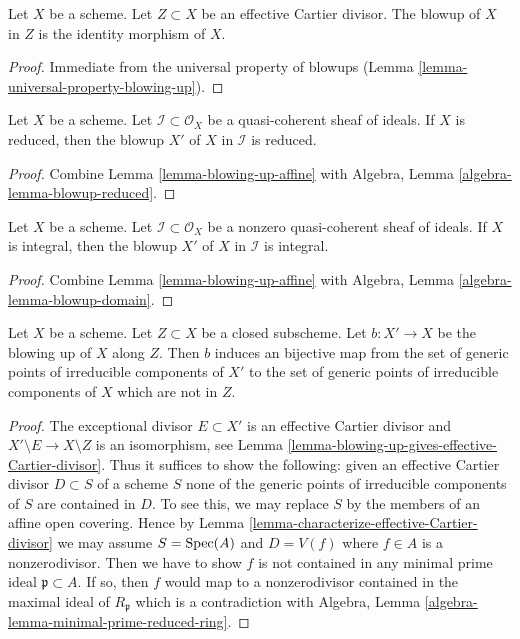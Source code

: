 \begin{lemma}
\label{lemma-blow-up-effective-Cartier-divisor}
Let $X$ be a scheme. Let $Z \subset X$ be an effective Cartier divisor.
The blowup of $X$ in $Z$ is the identity morphism of $X$.
\end{lemma}

\begin{proof}
Immediate from the universal property of blowups
(Lemma \ref{lemma-universal-property-blowing-up}).
\end{proof}

\begin{lemma}
\label{lemma-blow-up-reduced-scheme}
Let $X$ be a scheme. Let $\mathcal{I} \subset \mathcal{O}_X$ be a
quasi-coherent sheaf of ideals. If $X$ is reduced, then the
blowup $X'$ of $X$ in $\mathcal{I}$ is reduced.
\end{lemma}

\begin{proof}
Combine Lemma \ref{lemma-blowing-up-affine}
with Algebra, Lemma \ref{algebra-lemma-blowup-reduced}.
\end{proof}

\begin{lemma}
\label{lemma-blow-up-integral-scheme}
Let $X$ be a scheme. Let $\mathcal{I} \subset \mathcal{O}_X$ be a
nonzero quasi-coherent sheaf of ideals. If $X$ is integral, then the
blowup $X'$ of $X$ in $\mathcal{I}$ is integral.
\end{lemma}

\begin{proof}
Combine Lemma \ref{lemma-blowing-up-affine}
with Algebra, Lemma \ref{algebra-lemma-blowup-domain}.
\end{proof}

\begin{lemma}
\label{lemma-blow-up-and-irreducible-components}
Let $X$ be a scheme. Let $Z \subset X$ be a closed subscheme.
Let $b : X' \to X$ be the blowing up of $X$ along $Z$. Then
$b$ induces an bijective map from the set of generic points
of irreducible components of $X'$ to the set of generic points of
irreducible components of $X$ which are not in $Z$.
\end{lemma}

\begin{proof}
The exceptional divisor $E \subset X'$ is an effective Cartier divisor
and $X' \setminus E \to X \setminus Z$ is an isomorphism, see
Lemma \ref{lemma-blowing-up-gives-effective-Cartier-divisor}.
Thus it suffices to show the following: given an effective
Cartier divisor $D \subset S$ of a scheme $S$ none of the
generic points of irreducible components of $S$ are contained in $D$.
To see this, we may replace $S$ by the members of an affine open
covering. Hence by Lemma \ref{lemma-characterize-effective-Cartier-divisor}
we may assume $S = \mathop{\mathrm{Spec}}(A)$ and $D = V(f)$ where $f \in A$
is a nonzerodivisor. Then we have to show $f$ is not contained
in any minimal prime ideal $\mathfrak p \subset A$.
If so, then $f$ would map to a nonzerodivisor contained
in the maximal ideal of $R_\mathfrak p$ which is a contradiction
with Algebra, Lemma \ref{algebra-lemma-minimal-prime-reduced-ring}.
\end{proof}

